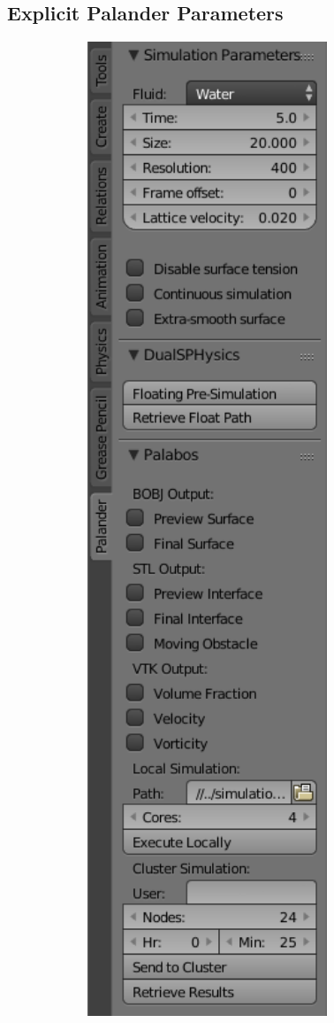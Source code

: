 \documentclass[12pt]{article}
\begin{document}
\subsection{Explicit Palander Parameters}

\begin{minipage}{0.25\textwidth}
\includegraphics[width=0.9\textwidth]{sidebar.png}
\end{minipage}
\end{document}
